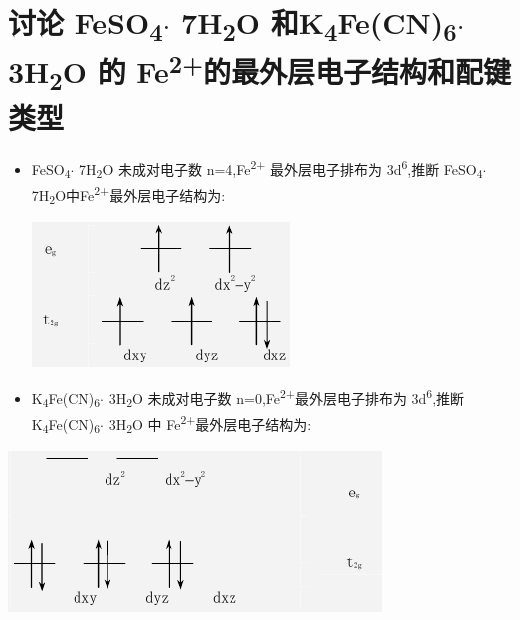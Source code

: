 \documentclass[11pt]{report}
\begin{document}
\section{讨论 FeSO\textsubscript{4}\(\cdot\) 7H\textsubscript{2}O 和K\textsubscript{4}Fe(CN)\textsubscript{6}\(\cdot\) 3H\textsubscript{2}O 的 Fe\textsuperscript{2+}的最外层电子结构和配键类型}
\label{sec:org6cb9ccb}
\begin{itemize}
\item FeSO\textsubscript{4}\(\cdot\) 7H\textsubscript{2}O 未成对电子数 n=4,Fe\textsuperscript{2+} 最外层电子排布为 3d\textsuperscript{6},推断 FeSO\textsubscript{4}\(\cdot\) 7H\textsubscript{2}O中Fe\textsuperscript{2+}最外层电子结构为:
\begin{center}
\includegraphics[width=.9\linewidth]{../img/3.png}
\end{center}
\item K\textsubscript{4}Fe(CN)\textsubscript{6}\(\cdot\) 3H\textsubscript{2}O 未成对电子数 n=0,Fe\textsuperscript{2+}最外层电子排布为 3d\textsuperscript{6},推断 K\textsubscript{4}Fe(CN)\textsubscript{6}\(\cdot\) 3H\textsubscript{2}O 中 Fe\textsuperscript{2+}最外层电子结构为:
\end{itemize}
\begin{center}
\includegraphics[width=.9\linewidth]{../img/4.png}
\end{center}
\end{document}
